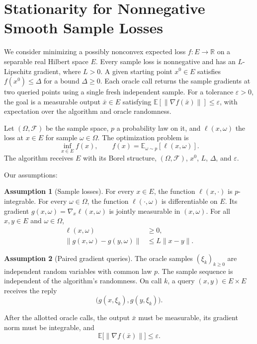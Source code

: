 \documentclass[10pt]{article}
\theoremstyle{definition}
\newtheorem{assumption}{Assumption}
\begin{document}
\section*{Stationarity for Nonnegative Smooth Sample Losses}
We consider minimizing a possibly nonconvex expected loss $f:E\to\mathbb{R}$ on a separable real Hilbert space $E$. Every sample loss is nonnegative and has an $L$-Lipschitz gradient, where $L>0$. A given starting point $x^0\in E$ satisfies $f(x^0)\leq\Delta$ for a bound $\Delta\geq 0$. Each oracle call returns the sample gradients at two queried points using a single fresh independent sample. For a tolerance $\varepsilon>0$, the goal is a measurable output $\bar{x}\in E$ satisfying $\mathbb{E}[\|\nabla f(\bar{x})\|]\leq\varepsilon$, with expectation over the algorithm and oracle randomness.

Let $(\Omega,\mathcal{F})$ be the sample space, $p$ a probability law on it, and $\ell(x,\omega)$ the loss at $x\in E$ for sample $\omega\in\Omega$. The optimization problem is
\[
\inf_{x\in E} f(x),
\qquad f(x)=\mathbb{E}_{\omega\sim p}[\ell(x,\omega)].
\]
The algorithm receives $E$ with its Borel structure, $(\Omega,\mathcal{F})$, $x^0$, $L$, $\Delta$, and $\varepsilon$.

Our assumptions:
\begin{assumption}[Sample losses]
For every $x\in E$, the function $\ell(x,\cdot)$ is $p$-integrable. For every $\omega\in\Omega$, the function $\ell(\cdot,\omega)$ is differentiable on $E$. Its gradient $g(x,\omega)=\nabla_x\ell(x,\omega)$ is jointly measurable in $(x,\omega)$. For all $x,y\in E$ and $\omega\in\Omega$,
\[
\begin{aligned}
\ell(x,\omega)&\geq 0,\\
\|g(x,\omega)-g(y,\omega)\|&\leq L\|x-y\|.
\end{aligned}
\]
\end{assumption}

\begin{assumption}[Paired gradient queries]
The oracle samples $(\xi_k)_{k\geq 0}$ are independent random variables with common law $p$. The sample sequence is independent of the algorithm's randomness. On call $k$, a query $(x,y)\in E\times E$ receives the reply
\[
\bigl(g(x,\xi_k),g(y,\xi_k)\bigr).
\]
\end{assumption}

After the allotted oracle calls, the output $\bar{x}$ must be measurable, its gradient norm must be integrable, and
\[
\mathbb{E}\bigl[\|\nabla f(\bar{x})\|\bigr]\leq\varepsilon.
\]
\end{document}
